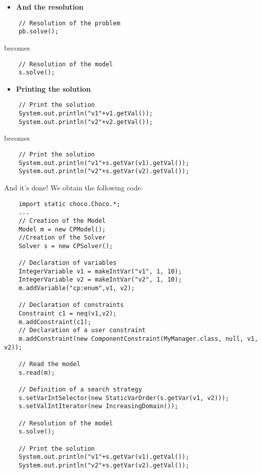 \begin{itemize}
	\item \textbf{And the resolution}
\end{itemize}

\begin{lstlisting}
	// Resolution of the problem
	pb.solve();
\end{lstlisting}
becomes
\begin{lstlisting}
	// Resolution of the model
	s.solve();
\end{lstlisting}

\begin{itemize}
	\item \textbf{Printing the solution}
\end{itemize}

\begin{lstlisting}
	// Print the solution
	System.out.println("v1"+v1.getVal());
	System.out.println("v2"+v2.getVal());
\end{lstlisting}
becomes
\begin{lstlisting}
	// Print the solution
	System.out.println("v1"+s.getVar(v1).getVal());
	System.out.println("v2"+s.getVar(v2).getVal());
\end{lstlisting}

And it's done!
We obtain the following code:
\begin{lstlisting}
	import static choco.Choco.*;
	...
	// Creation of the Model
	Model m = new CPModel();
	//Creation of the Solver
	Solver s = new CPSolver();
	
	// Declaration of variables
	IntegerVariable v1 = makeIntVar("v1", 1, 10);
	IntegerVariable v2 = makeIntVar("v2", 1, 10);
	m.addVariable("cp:enum",v1, v2);
	
	// Declaration of constraints
	Constraint c1 = neq(v1,v2);
	m.addConstraint(c1);
	// Declaration of a user constraint
	m.addConstraint(new ComponentConstraint(MyManager.class, null, v1, v2));
	
	// Read the model
	s.read(m);
	
	// Definition of a search strategy
	s.setVarIntSelector(new StaticVarOrder(s.getVar(v1, v2)));
	s.setValIntIterator(new IncreasingDomain());
	
	// Resolution of the model
	s.solve();
	
	// Print the solution
	System.out.println("v1"+s.getVar(v1).getVal());
	System.out.println("v2"+s.getVar(v2).getVal());
\end{lstlisting}

